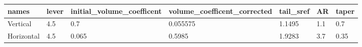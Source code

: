 \begin{tabular}{lllllll}
names & lever & initial_volume_coefficent & volume_coefficent_corrected & tail_sref & AR & taper \\ 
\hline 
Vertical & 4.5 & 0.7 & 0.055575 & 1.1495 & 1.1 & 0.7 \\ 
Horizontal & 4.5 & 0.065 & 0.5985 & 1.9283 & 3.7 & 0.35 \\ 
\hline 
\end{tabular}